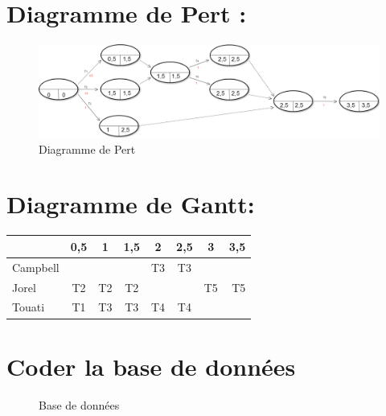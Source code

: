 \documentclass[a4paper,10pt]{report}
\begin{document}
	\section*{Diagramme de Pert :}
    \begin{figure}[!h]
        \centering
        \includegraphics[scale=0.28]{plan.png}
        \caption[Diagramme de Pert]{Diagramme de Pert}
    \end{figure}


\section*{Diagramme de Gantt:}

\begin{tabular}{|l|c|c|c|c|c|c|r|}
  \hline
   & 0,5 & 1 & 1,5 & 2 & 2,5 & 3 & 3,5\\
  \hline
  Campbell &  &  &  & T3 & T3 & & \\
  Jorel & T2 & T2 & T2 & & & T5 & T5 \\
  Touati & T1 & T3 & T3 & T4 & T4 & & \\
  \hline
\end{tabular}

\newpage

\section*{Coder la base de données}
	\begin{figure}[!h]
    \centering
    
    \caption[Base de données]{Base de données}
    \end{figure}
\end{document}
